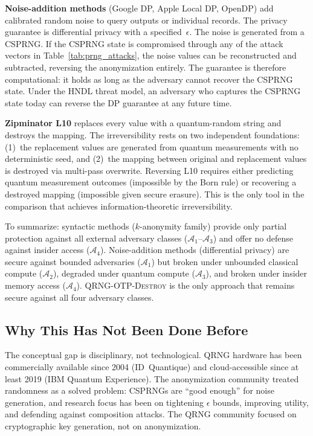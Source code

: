 \documentclass[journal]{IEEEtran}
\begin{document}
\textbf{Noise-addition methods} (Google DP, Apple Local DP, OpenDP) add calibrated random noise to query outputs or individual records. The privacy guarantee is differential privacy with a specified~$\epsilon$. The noise is generated from a CSPRNG. If the CSPRNG state is compromised through any of the attack vectors in Table~\ref{tab:prng_attacks}, the noise values can be reconstructed and subtracted, reversing the anonymization entirely. The guarantee is therefore computational: it holds as long as the adversary cannot recover the CSPRNG state. Under the HNDL threat model, an adversary who captures the CSPRNG state today can reverse the DP guarantee at any future time.

\textbf{Zipminator L10} replaces every value with a quantum-random string and destroys the mapping. The irreversibility rests on two independent foundations: (1)~the replacement values are generated from quantum measurements with no deterministic seed, and (2)~the mapping between original and replacement values is destroyed via multi-pass overwrite. Reversing L10 requires either predicting quantum measurement outcomes (impossible by the Born rule) or recovering a destroyed mapping (impossible given secure erasure). This is the only tool in the comparison that achieves information-theoretic irreversibility.

To summarize: syntactic methods ($k$-anonymity family) provide only partial protection against all external adversary classes ($\mathcal{A}_1$--$\mathcal{A}_3$) and offer no defense against insider access ($\mathcal{A}_4$). Noise-addition methods (differential privacy) are secure against bounded adversaries ($\mathcal{A}_1$) but broken under unbounded classical compute ($\mathcal{A}_2$), degraded under quantum compute ($\mathcal{A}_3$), and broken under insider memory access ($\mathcal{A}_4$). \textsc{QRNG-OTP-Destroy} is the only approach that remains secure against all four adversary classes.

\subsection{Why This Has Not Been Done Before}
\label{subsec:gap}

The conceptual gap is disciplinary, not technological. QRNG hardware has been commercially available since 2004 (ID~Quantique) and cloud-accessible since at least 2019 (IBM Quantum Experience). The anonymization community treated randomness as a solved problem: CSPRNGs are ``good enough'' for noise generation, and research focus has been on tightening $\epsilon$ bounds, improving utility, and defending against composition attacks. The QRNG community focused on cryptographic key generation, not on anonymization.
\end{document}
